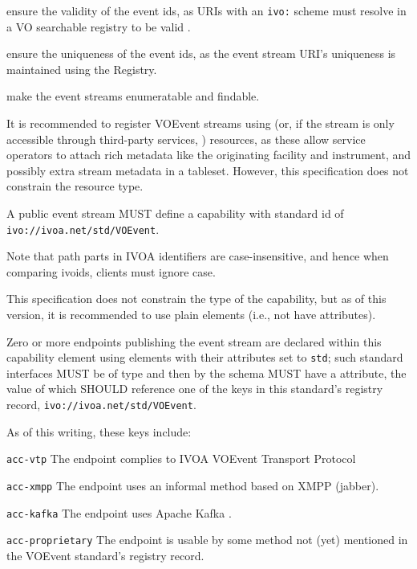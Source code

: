 \documentclass[11pt,a4paper]{ivoa}
\begin{document}
\begin{compactitem}
\item ensure the validity of the event ids, as URIs with an \verb|ivo:|
scheme must resolve in a VO searchable registry to be valid
\citep{2016ivoa.spec.0523D}.
\item ensure the uniqueness of the event ids, as the event stream URI's
uniqueness is maintained using the Registry.
\item make the event streams enumeratable and findable.
\end{compactitem}

It is recommended to register VOEvent streams using
 (or, if the stream is only accessible through
third-party services, )
resources, as these allow service operators
to attach rich metadata like the originating facility and instrument, and
possibly extra stream metadata in a tableset.  However, this
specification does not constrain the resource type.

A public event stream MUST define a capability with standard id of
\nolinkurl{ivo://ivoa.net/std/VOEvent}.

Note that path parts in IVOA identifiers are case-insensitive, and hence
when comparing ivoids, clients must ignore case.

This specification does not constrain the type of the capability, but as
of this version, it is recommended to use plain 
elements (i.e., not have  attributes).

Zero or more endpoints publishing the event stream are declared within
this capability element using  elements with their
 attributes set to \verb|std|; such standard interfaces MUST
be of type  and then by the schema MUST have
a  attribute, the value of which SHOULD reference one
of the keys in this standard's registry record,
\nolinkurl{ivo://ivoa.net/std/VOEvent}.

As of this writing, these keys include:

\begin{compactitem}
\item  \verb|acc-vtp| The endpoint complies to IVOA VOEvent Transport
  Protocol \citep{2017ivoa.spec.0320S}
\item \verb|acc-xmpp| The endpoint uses an informal method based on
    	XMPP (jabber).
\item \verb|acc-kafka| The endpoint uses Apache Kafka \citep{kafka}.
\item \verb|acc-proprietary| The endpoint is usable by some
  method not (yet) mentioned in the VOEvent standard's registry record.
\end{compactitem}
\end{document}
